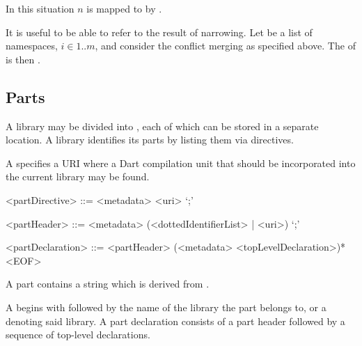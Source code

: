 \documentclass[makeidx]{article}
\begin{document}
{\begin{itemize}
  In this situation $n$ is mapped to \ConflictValue{}
  by .
\end{itemize}


\LMHash{}%
It is useful to be able to refer to the result of narrowing.
Let  be a list of namespaces, $i \in 1 .. m$,
and consider the conflict merging as specified above.
The
of  is then .


\subsection{Parts}

\LMHash{}%
A library may be divided into ,
each of which can be stored in a separate location.
A library identifies its parts by listing them via \PART{} directives.

\LMHash{}%
A  specifies a URI where
a Dart compilation unit that should be incorporated into the current library
may be found.

\begin{grammar}
<partDirective> ::= <metadata> \PART{} <uri> `;'

<partHeader> ::= <metadata> \PART{} \OF{} (<dottedIdentifierList> | <uri>) `;'

<partDeclaration> ::=
  <partHeader> (<metadata> <topLevelDeclaration>)* <EOF>
\end{grammar}

\LMHash{}%
A part contains a string which is derived from .


\LMHash{}%
A  begins with \PART{} \OF{} followed by
the name of the library the part belongs to,
or a  denoting said library.
A part declaration consists of a part header followed by
a sequence of top-level declarations.

}
\end{document}
